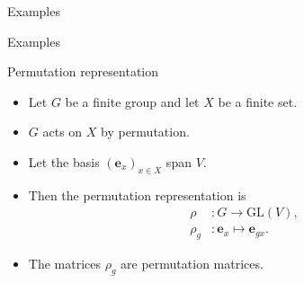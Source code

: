 \documentclass[10pt]{beamer}
\newcommand{\GL}{\text{GL}}
\newcommand{\Cyc}{\mathcal{C}}
\newcommand{\bas}{\mathbf{e}}
\begin{document}
\begin{frame}{Examples}
	\end{frame}
	\begin{frame}{Examples}
		\begin{block}{Permutation representation}
			\begin{itemize}
				\item Let $G$ be a finite group and let $X$ be a finite set.
				
				\item $G$ acts on $X$ by permutation.\pause
				
				\item Let the basis $(\bas_x)_{x \in X}$ span $V$.
				
				\item Then the permutation representation is
				\begin{align*}
					\rho &: G \rightarrow \GL(V), \\
					\rho_g &: \bas_x \mapsto \bas_{gx}.
				\end{align*}\pause
				
				\item The matrices $\rho_g$ are \alert{permutation matrices}.
			\end{itemize}
		\end{block}
		
	\end{frame}
\end{document}
